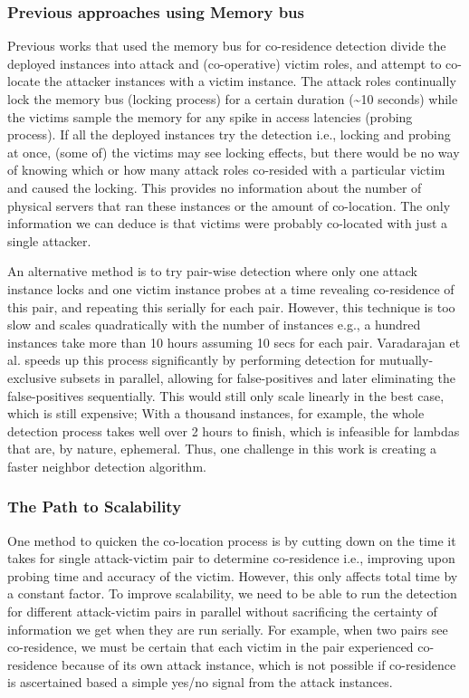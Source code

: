 \subsubsection{Previous approaches using Memory bus}
Previous works that used the memory bus for co-residence detection divide the
deployed instances into attack and (co-operative) victim roles, and attempt to
co-locate the attacker instances with a victim instance. The attack roles
continually lock the memory bus (locking process) for a certain duration
(\textasciitilde 10 seconds) while the victims sample the memory for any spike
in access latencies (probing process). If all the deployed instances try the
detection i.e., locking and probing at once, (some of) the victims may see
locking effects, but there would be no way of knowing which or how many attack
roles co-resided with a particular victim and caused the locking. This provides
no information about the number of physical servers that ran these instances or
the amount of co-location. The only information we can deduce is that victims
were probably co-located with just a single attacker.

An alternative method is to try pair-wise detection where only one attack
instance locks and one victim instance probes at a time revealing co-residence
of this pair, and repeating this serially for each pair. However, this technique
is too slow and scales quadratically with the number of instances e.g., a
hundred instances take more than 10 hours assuming 10 secs for each pair. 
Varadarajan et al.\cite{varad191016} speeds up 
this process significantly by performing detection for mutually-exclusive
subsets in parallel, allowing for false-positives and later eliminating the
false-positives sequentially. This would still only scale linearly in the best
case, which is still expensive; With a thousand
instances, for example, the whole detection process takes well over 2 hours to
finish, which is infeasible for lambdas that are, by nature, ephemeral. Thus,
one challenge in this work is creating a faster neighbor detection algorithm.

\subsubsection{The Path to Scalability}

One method to quicken the co-location process is by cutting down on the time it
takes for single attack-victim pair to determine co-residence i.e., improving
upon probing time and accuracy of the victim. However, this only affects total
time by a constant factor. To improve scalability, we need to be able to run
the detection for different attack-victim pairs in parallel without
sacrificing the certainty of information we get when they are run serially. 
For example, when two pairs see co-residence, 
we must be certain that each victim in the pair experienced
co-residence because of its own attack instance, which is not possible if
co-residence is ascertained based a simple yes/no signal from the attack
instances. 

